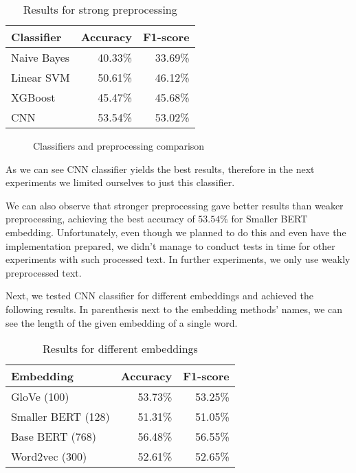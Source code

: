 \begin{table}[!h]
\centering
\begin{tabular}{l|r|r}
\textbf{Classifier} & \textbf{Accuracy} & \textbf{F1-score} \\ \hline
Naive Bayes         & 40.33\%           & 33.69\%           \\
Linear SVM          & 50.61\%           & 46.12\%           \\
XGBoost             & 45.47\%           & 45.68\%           \\
CNN                 & 53.54\%           & 53.02\%          
\end{tabular}
\caption{Results for strong preprocessing}
\end{table}
\begin{figure}[!h]
\centering

\caption{Classifiers and preprocessing comparison}
\end{figure} 

As we can see CNN classifier yields the best results, therefore in the next experiments we limited ourselves to just this classifier. 

We can also observe that stronger preprocessing gave better results than weaker preprocessing, achieving the best accuracy of $53.54\%$ for Smaller BERT embedding. Unfortunately, even though we planned to do this and even have the implementation prepared, we didn't manage to conduct tests in time for other experiments with such processed text. In further experiments, we only use weakly preprocessed text.

Next, we tested CNN classifier for different embeddings and achieved the following results. In parenthesis next to the embedding methods' names, we can see the length of the given embedding of a single word.
\begin{table}[!h]
\centering
\begin{tabular}{l|r|r}
\textbf{Embedding} & \textbf{Accuracy} & \textbf{F1-score} \\ \hline
GloVe (100)        & 53.73\%           & 53.25\%           \\
Smaller BERT (128) & 51.31\%           & 51.05\%           \\
Base BERT (768)    & 56.48\%           & 56.55\%           \\
Word2vec (300)     & 52.61\%           & 52.65\%          
\end{tabular}
\caption{Results for different embeddings}
\end{table}

